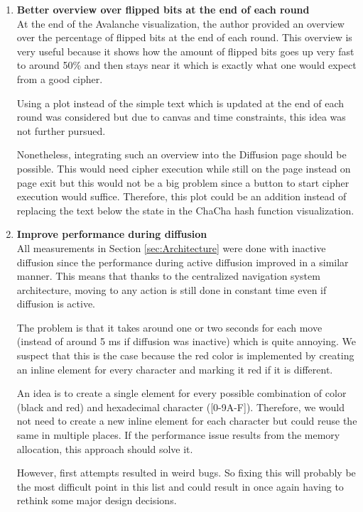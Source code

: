 \begin{enumerate}[wide, labelwidth=!, labelindent=0pt]
\setlength{\parskip}{0pt}

\item \textbf{Better overview over flipped bits at the end of each round}\\
At the end of the Avalanche visualization, the author provided an overview over the percentage of flipped bits at the end of each round. This overview is very useful because it shows how the amount of flipped bits goes up very fast to around 50\% and then stays near it which is exactly what one would expect from a good cipher.

Using a plot instead of the simple text which is updated at the end of each round was considered but due to canvas and time constraints, this idea was not further pursued. 

Nonetheless, integrating such an overview into the Diffusion page should be possible. This would need cipher execution while still on the page instead on page exit but this would not be a big problem since a button to start cipher execution would suffice. Therefore, this plot could be an addition instead of replacing the text below the state in the ChaCha hash function visualization.

\item \textbf{Improve performance during diffusion}\\
All measurements in Section \ref{sec:Architecture} were done with inactive diffusion since the performance during active diffusion improved in a similar manner. This means that thanks to the centralized navigation system architecture, moving to any action is still done in constant time even if diffusion is active.

The problem is that it takes around one or two seconds for each move (instead of around 5 ms if diffusion was inactive) which is quite annoying. We suspect that this is the case because the red color is implemented by creating an inline element for every character and marking it red if it is different.

An idea is to create a single element for every possible combination of color (black and red) and hexadecimal character ([0-9A-F]). Therefore, we would not need to create a new inline element for each character but could reuse the same in multiple places. If the performance issue results from the memory allocation, this approach should solve it. 

However, first attempts resulted in weird bugs. So fixing this will probably be the most difficult point in this list and could result in once again having to rethink some major design decisions.


\end{enumerate}
